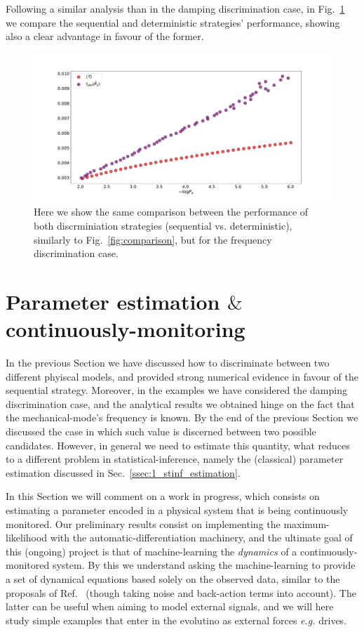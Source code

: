 Following a similar analysis than in the damping discrimination case, in Fig.~\ref{fig:compa_freq} we compare the sequential and deterministic strategies' performance, showing also a clear advantage in favour of the former.
\begin{figure}[t!]
    \centering
    \includegraphics[width=1.\textwidth]{Figures/CMON/freq-discri/error_comparison_short_times_nicer.pdf}
    \caption{Here we show the same comparison between the performance of both discrminiation strategies (sequential vs. deterministic), similarly to Fig.~\ref{fig:comparison}, but for the frequency discrimination case.}
    \label{fig:compa_freq}
\end{figure}

\section{Parameter estimation $\&$ continuously-monitoring}\label{sec:cmonEST}
In the previous Section we have discussed how to discriminate between two different phyiscal models, and provided strong numerical evidence in favour of the sequential strategy. Moreover, in the examples we have considered the damping discrimination case, and the analytical results we obtained hinge on the fact that the mechanical-mode's frequency is known. By the end of the previous Section we discussed the case in which such value is discerned between two possible candidates. However, in general we need to estimate this quantity, what reduces to a different problem in statistical-inference, namely the (classical) parameter estimation discussed in Sec.~\ref{ssec:1_stinf_estimation}.

In this Section we will comment on a work in progress, which consists on estimating a parameter encoded in a physical system that is being continuously monitored. Our preliminary results consist on implementing the maximum-likelihood with the automatic-differentiation machinery, and the ultimate goal of this (ongoing) project is that of machine-learning the \textit{dynamics} of a continuously-monitored system. By this we understand asking the machine-learning to provide a set of dynamical equations based solely on the observed data, similar to the proposals of Ref.~\cite{sindy} (though taking noise and back-action terms into account). The latter can be useful when aiming to model external signals, and we will here study simple examples that enter in the evolutino as external forces \textit{e.g.} drives.

